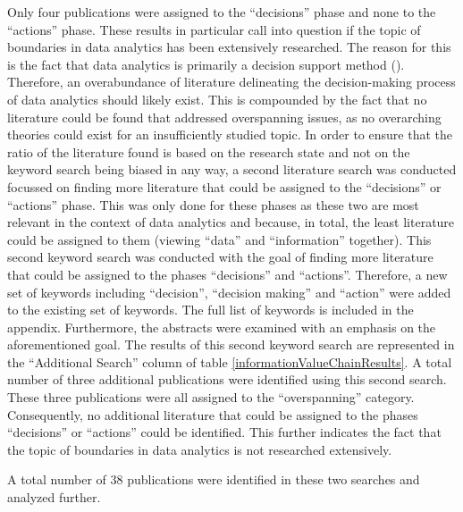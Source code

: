 Only four publications were assigned to the \enquote{decisions} phase and none to the \enquote{actions} phase. These results in particular call into question if the topic of boundaries in data analytics has been extensively researched. The reason for this is the fact that data analytics is primarily a decision support method (\cite{Runkler.2020}). Therefore, an overabundance of literature delineating the decision-making process of data analytics should likely exist. This is compounded by the fact that no literature could be found that addressed overspanning issues, as no overarching theories could exist for an insufficiently studied topic. In order to ensure that the ratio of the literature found is based on the research state and not on the keyword search being biased in any way, a second literature search was conducted focussed on finding more literature that could be assigned to the \enquote{decisions} or \enquote{actions} phase. This was only done for these phases as these two are most relevant in the context of data analytics and because, in total, the least literature could be assigned to them (viewing \enquote{data} and  \enquote{information} together). This second keyword search was conducted with the goal of finding more literature that could be assigned to the phases \enquote{decisions} and \enquote{actions}. Therefore, a new set of keywords including \enquote{decision}, \enquote{decision making} and \enquote{action} were added to the existing set of keywords. The full list of keywords is included in the appendix. Furthermore, the abstracts were examined with an emphasis on the aforementioned goal. The results of this second keyword search are represented in the \enquote{Additional Search} column of table \ref{informationValueChainResults}. A total number of three additional publications were identified using this second search. These three publications were all assigned to the \enquote{overspanning} category. Consequently, no additional literature that could be assigned to the phases \enquote{decisions} or \enquote{actions} could be identified. This further indicates the fact that the topic of boundaries in data analytics is not researched extensively. 

A total number of 38 publications were identified in these two searches and analyzed further.


